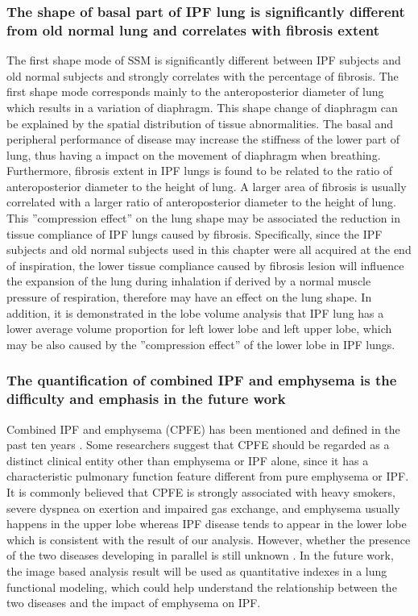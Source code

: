 \subsubsection{The shape of basal part of IPF lung is significantly different from old normal lung and correlates with fibrosis extent}
The first shape mode of SSM is significantly different between IPF subjects and old normal subjects and strongly correlates with the percentage of fibrosis. The first shape mode corresponds mainly to the anteroposterior diameter of lung which results in a variation of diaphragm. This shape change of diaphragm can be explained by the spatial distribution of tissue abnormalities. The basal and peripheral performance of disease may increase the stiffness of the lower part of lung, thus having a impact on the movement of diaphragm when breathing. Furthermore, fibrosis extent in IPF lungs is found to be related to the ratio of anteroposterior diameter to the height of lung. A larger area of fibrosis is usually correlated with a larger ratio of anteroposterior diameter to the height of lung. This ''compression effect'' on the lung shape may be associated the reduction in tissue compliance of IPF lungs caused by fibrosis. Specifically, since the IPF subjects and old normal subjects used in this chapter were all acquired at the end of inspiration, the lower tissue compliance caused by fibrosis lesion will influence the expansion of the lung during inhalation if derived by a normal muscle pressure of respiration, therefore may have an effect on the lung shape. In addition, it is demonstrated in the lobe volume analysis that IPF lung has a lower average volume proportion for left lower lobe and left upper lobe, which may be also caused by the ''compression effect'' of the lower lobe in IPF lungs.

\subsubsection{The quantification of combined IPF and emphysema is the difficulty and emphasis in the future work}
Combined IPF and emphysema (CPFE) has been mentioned and defined in the past ten years \citep{cottin2005combined,meltzer2008idiopathic}. Some researchers suggest that CPFE should be regarded as a distinct clinical entity other than emphysema or IPF alone, since it has a characteristic pulmonary function feature different from pure emphysema or IPF. It is commonly believed that CPFE is strongly associated with heavy smokers, severe dyspnea on exertion and impaired gas exchange, and emphysema usually happens in the upper lobe whereas IPF disease tends to appear in the lower lobe \citep{lin2015combined} which is consistent with the result of our analysis. However, whether the presence of the two diseases developing in parallel is still unknown \citep{cottin2005combined, king2011idiopathic, lin2015combined}. In the future work, the image based analysis result will be used as quantitative indexes in a lung functional modeling, which could help understand the relationship between the two diseases and the impact of emphysema on IPF.

